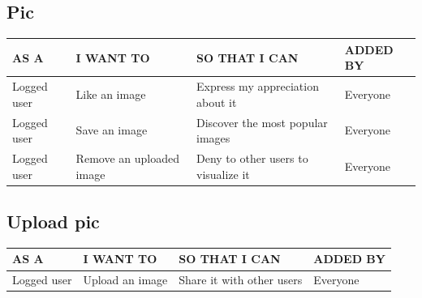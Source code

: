 \documentclass[11pt, a4paper]{article}
\begin{document}
\subsection{Pic}
\begin{table}[H]
    \centering
    \begin{tabular}{|p{3.3cm}|p{4.5cm}|p{5.7cm}|p{3cm}|}
    \hline
    \rowcolor[HTML]{EFEFEF} 
    AS A        & I WANT TO                & SO THAT I CAN                       & ADDED BY \\ \hline
    Logged user & Like an image            & Express my appreciation about it    & Everyone \\ \hline
    Logged user & Save an image            & Discover the most popular images    & Everyone \\ \hline
    Logged user & Remove an uploaded image & Deny to other users to visualize it & Everyone \\ \hline    
    \end{tabular}
\end{table}
\begin{figure}[H]
    \centering
\end{figure}

\subsection{Upload pic}
\begin{table}[H]
    \centering
    \begin{tabular}{|p{4.5cm}|p{4cm}|p{5cm}|p{3cm}|}
    \hline
    \rowcolor[HTML]{EFEFEF} 
    AS A        & I WANT TO             & SO THAT I CAN                         & ADDED BY \\ \hline
    Logged user & Upload an image       & Share it with other users             & Everyone \\ \hline    
    \end{tabular}
\end{table}
\begin{figure}[H]
    \centering
\end{figure}
\end{document}
